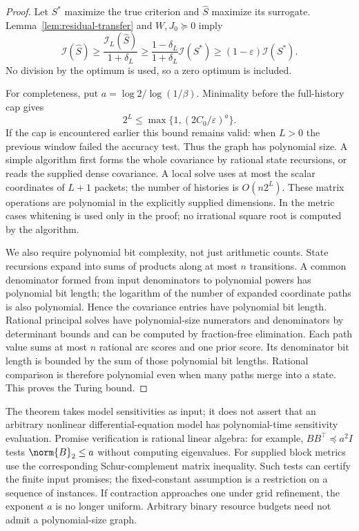 \begin{proof}
Let $S^*$ maximize the true criterion and $\widehat S$ maximize its
surrogate. Lemma~\ref{lem:residual-transfer} and $W,J_0\succeq0$ imply
\begin{equation}
 \mathcal I(\widehat S)\ge
 \frac{\mathcal I_L(\widehat S)}{1+\delta_L}\ge
 \frac{1-\delta_L}{1+\delta_L}\mathcal I(S^*)
 \ge(1-\varepsilon)\mathcal I(S^*).
 \label{eq:trace-approximation-ratio}
\end{equation}
No division by the optimum is used, so a zero optimum is included.

For completeness, put $a=\log2/\log(1/\beta)$. Minimality before the
full-history cap gives
\[
 2^L\le\max\{1,(2C_0/\varepsilon)^a\}.
\]
If the cap is encountered earlier this bound remains valid: when $L>0$ the
previous window failed the accuracy test. Thus the graph has polynomial
size. A simple algorithm first forms the whole covariance by rational state
recursions, or reads the supplied dense covariance. A local solve uses at most
the scalar coordinates of $L+1$ packets; the number of histories is
$O(n2^L)$. These matrix operations are polynomial in the explicitly supplied
dimensions. In the metric cases whitening is used only in the proof; no
irrational square root is computed by the algorithm.

We also require polynomial bit complexity, not just arithmetic counts.
State recursions expand into sums of products along at most $n$ transitions.
A common denominator formed from input denominators to polynomial powers has
polynomial bit length; the logarithm of the number of expanded coordinate
paths is also polynomial. Hence the covariance entries have polynomial bit
length. Rational principal solves have polynomial-size numerators and
denominators by determinant bounds and can be computed by fraction-free
elimination. Each path value sums at most $n$ rational arc scores and one
prior score. Its denominator bit length is bounded by the sum of those
polynomial bit lengths. Rational comparison is therefore polynomial even
when many paths merge into a state. This proves the Turing bound.
\end{proof}

The theorem takes model sensitivities as input; it does not assert that an
arbitrary nonlinear differential-equation model has polynomial-time sensitivity
evaluation. Promise verification is rational linear algebra: for example,
$B B^\top\preceq a^2I$ tests $\norm{B}_2\le a$ without computing eigenvalues.
For supplied block metrics use the corresponding Schur-complement matrix
inequality. Such tests can certify the finite input promises; the fixed-constant
assumption is a restriction on a sequence of instances. If contraction approaches
one under grid refinement, the exponent $a$ is no longer uniform. Arbitrary
binary resource budgets need not admit a polynomial-size graph.

